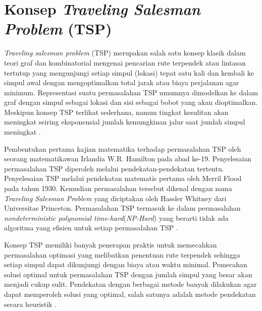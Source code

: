 \section{Konsep \textit{Traveling Salesman Problem} (TSP)}
\vspace{-4mm}
{\frenchspacing
    \textit{Traveling salesman problem} (TSP) merupakan salah satu konsep klasik dalam teori graf
    dan kombinatorial mengenai pencarian rute terpendek atau lintasan tertutup yang mengunjungi
    setiap simpul (lokasi) tepat satu kali dan kembali ke simpul awal dengan mengoptimalkan total jarak atau
    biaya perjalanan agar minimum. Representasi suatu permasalahan TSP umumnya dimodelkan ke dalam graf
    dengan simpul sebagai lokasi dan sisi sebagai bobot yang akan dioptimalkan.
    Meskipun konsep TSP terlihat sederhana, namun tingkat kesulitan akan meningkat seiring
    eksponensial jumlah kemungkinan jalur saat jumlah simpul meningkat .

    Pembentukan pertama kajian matematika terhadap permasalahan TSP oleh seorang matematikawan Irlandia W.R. Hamilton pada abad ke-19.
    Penyelesaian permasalahan TSP diperoleh melalui pendekatan-pendekatan tertentu.
    Penyelesaian TSP melalui pendekatan matematis pertama oleh Merril Flood pada tahun 1930.
    Kemudian permasalahan tersebut dikenal dengan nama \textit{Traveling Salesman Problem} yang diciptakan oleh Hassler Whitney dari Universitas Princeton.
    Permasalahan TSP termasuk ke dalam permasalahan \textit{nondeterministic polynomial time-hard}(\textit{NP-Hard}) yang berarti tidak ada algoritma yang efisien untuk setiap permasalahan TSP .

    Konsep TSP memiliki banyak penerapan praktis untuk memecahkan permasalahan optimasi yang melibatkan
    penentuan rute terpendek sehingga setiap simpul dapat dikunjungi dengan biaya atau waktu minimal.
    Pemecahan solusi optimal untuk permasalahan TSP dengan jumlah simpul yang besar akan menjadi cukup sulit.
    Pendekatan dengan berbagai metode banyak dilakukan agar dapat memperoleh solusi yang optimal,
    salah satunya adalah metode pendekatan secara heuristik .
}
\vspace{-3mm}


